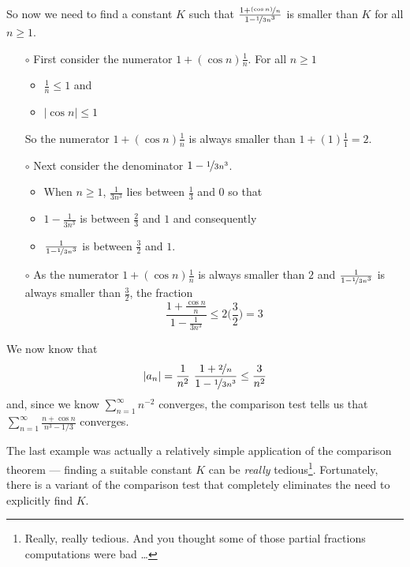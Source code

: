 \begin{eg}[$\sum_{n=1}^\infty\frac{n+\cos n}{n^3-1/3}$]
\begin{itemize}
\begin{equation*}
\end{equation*}
So now we need to find a constant $K$ such that
$\frac{1+\nicefrac{(\cos n)}{n}}{1-\nicefrac{1}{3n^3}}$
is smaller than $K$ for all $n\ge 1$.
\begin{itemize}
\item[$\circ$]
First consider the numerator $1+(\cos n)\frac{1}{n}$.
For all $n\ge 1$
\begin{itemize}
\item $\frac{1}{n}\le 1$ and
\item $|\cos n|\le 1$
\end{itemize}
So the numerator $1+(\cos n)\frac{1}{n}$
is always smaller than $1+(1)\frac{1}{1}=2$.
\item[$\circ$]
Next consider the denominator $1-\nicefrac{1}{3n^3}$.
\begin{itemize}
\item
When $n\ge 1$, $\frac{1}{3n^3}$ lies between $\frac{1}{3}$ and $0$
so that
\item
$1-\frac{1}{3n^3}$ is between $\frac{2}{3}$ and $1$ and consequently
\item
$\frac{1}{1-\nicefrac{1}{3n^3}}$
is between $\frac{3}{2}$ and $1$.
\end{itemize}
\item[$\circ$] As the numerator $1+(\cos n)\frac{1}{n}$ is always smaller
than $2$ and $\frac{1}{1-\nicefrac{1}{3n^3}}$
is always smaller than $\frac{3}{2}$, the fraction
\begin{equation*}
\frac{1+\frac{\cos n}{n}}{1-\frac{1}{3n^3}}
\le 2\Big(\frac{3}{2}\Big)
=3
\end{equation*}
\end{itemize}
We now know that
\begin{equation*}
|a_n| =\frac{1}{n^2}\
   \frac{1+\nicefrac{2}{n}}{1-\nicefrac{1}{3n^3}}
\le  \frac{3}{n^2}
\end{equation*}
and, since we know $\sum_{n=1}^\infty n^{-2}$ converges,
the comparison test tells us that
$\sum_{n=1}^\infty\frac{n+\cos n}{n^3-1/3}$ converges.
\end{itemize}
\end{eg}

The last example was actually a relatively simple application of the comparison theorem --- finding a suitable constant
$K$ can be \emph{really} tedious\footnote{Really, really tedious. And you thought some of those partial fractions
computations were bad \dots}. Fortunately, there is a variant of the
comparison test that completely eliminates the need to explicitly
find $K$.

